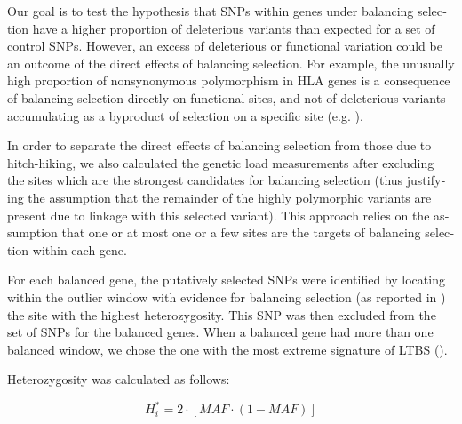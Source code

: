 \begin{refsection}
\begin{otherlanguage}{english}
	Our goal is to test the hypothesis that SNPs within genes under balancing selection have a higher proportion of deleterious variants than expected for a set of control SNPs. However, an excess of deleterious or functional variation could be an outcome of the direct effects of balancing selection. For example, the unusually high proportion of nonsynonymous polymorphism in HLA genes is a consequence of balancing selection directly on functional sites, and not of deleterious variants accumulating as a byproduct of selection on a specific site (e.g. \cite{Hughes1988,Bitarello2015}).
    
    In order to separate the direct  effects of balancing selection from those due to hitch-hiking, we also calculated the genetic load measurements after excluding the sites which are the strongest candidates for balancing selection (thus justifying the assumption that the remainder of the highly polymorphic variants are present due to linkage with this selected variant). This approach relies on the assumption that one or at most one or a few sites are the targets of balancing selection within each gene. 
 


For each balanced gene, the putatively selected SNPs were identified by locating within the outlier window with evidence for balancing selection (as reported in \cite{Bitarello2016}) the site with the highest heterozygosity. This SNP was then excluded from the  set of SNPs for the balanced genes. When a balanced gene had more than one balanced window, we chose the one with the most extreme signature of LTBS (\cite{Bitarello2016}). 

Heterozygosity was calculated as follows:

\begin{equation}
H_{i}^{*}=2 \cdot [MAF \cdot (1-MAF)]
\end{equation}


\end{otherlanguage}
\end{refsection}
